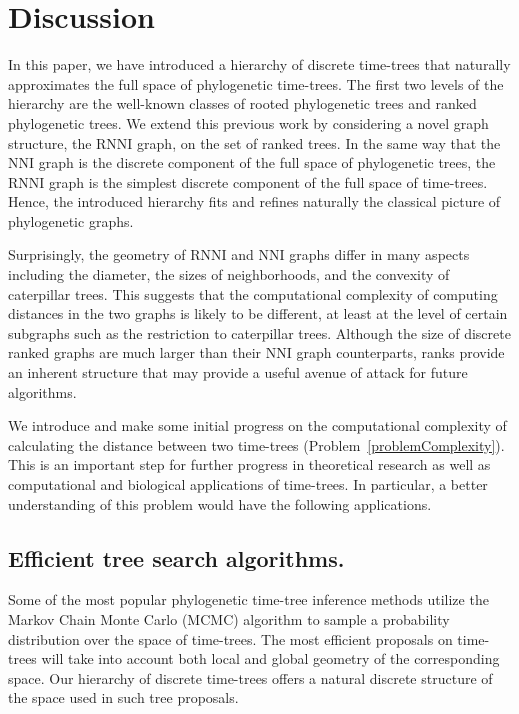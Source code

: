 \documentclass[11pt]{amsart}
\theoremstyle{definition}
\newcommand{\nni}{\mathrm{NNI}}
\newcommand{\rnni}{\mathrm{RNNI}}
\begin{document}
\section{Discussion}

In this paper, we have introduced a hierarchy of discrete time-trees that naturally approximates the full space of phylogenetic time-trees.
The first two levels of the hierarchy are the well-known classes of rooted phylogenetic trees and ranked phylogenetic trees.
We extend this previous work by considering a novel graph structure, the $\rnni$ graph, on the set of ranked trees.
In the same way that the $\nni$ graph is the discrete component of the full space of phylogenetic trees, the $\rnni$ graph is the simplest discrete component of the full space of time-trees.
Hence, the introduced hierarchy fits and refines naturally the classical picture of phylogenetic graphs.

Surprisingly, the geometry of $\rnni$ and $\nni$ graphs differ in many aspects including the diameter, the sizes of neighborhoods, and the convexity of caterpillar trees.
This suggests that the computational complexity of computing distances in the two graphs is likely to be different, at least at the level of certain subgraphs such as the restriction to caterpillar trees.
Although the size of discrete ranked graphs are much larger than their $\nni$ graph counterparts, ranks provide an inherent structure that may provide a useful avenue of attack for future algorithms.

We introduce and make some initial progress on the computational complexity of calculating the distance between two time-trees (Problem~\ref{problemComplexity}).
This is an important step for further progress in theoretical research as well as computational and biological applications of time-trees.
In particular, a better understanding of this problem would have the following applications.


\subsection{Efficient tree search algorithms.}

Some of the most popular phylogenetic time-tree inference methods utilize the Markov Chain Monte Carlo (MCMC) algorithm to sample a probability distribution over the space of time-trees.
The most efficient proposals on time-trees will take into account both local and global geometry of the corresponding space.
Our hierarchy of discrete time-trees offers a natural discrete structure of the space used in such tree proposals.
\end{document}
